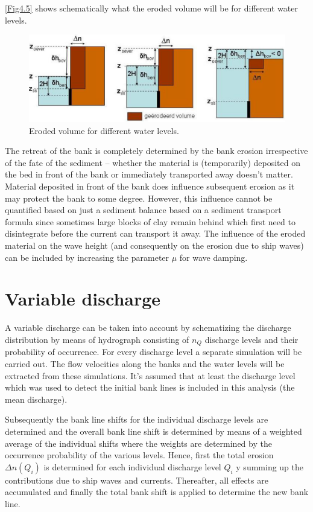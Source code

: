 \autoref{Fig4.5} shows schematically what the eroded volume will be for different water levels.

\begin{figure}
\includegraphics[width=\textwidth]{figures/Fig4-5.png}
\caption{Eroded volume for different water levels.}
\label{Fig4.5}
\end{figure}

The retreat of the bank is completely determined by the bank erosion irrespective of the fate of the sediment -- whether the material is (temporarily) deposited on the bed in front of the bank or immediately transported away doesn't matter.
Material deposited in front of the bank does influence subsequent erosion as it may protect the bank to some degree.
However, this influence cannot be quantified based on just a sediment balance based on a sediment transport formula since sometimes large blocks of clay remain behind which first need to disintegrate before the current can transport it away.
The influence of the eroded material on the wave height (and consequently on the erosion due to ship waves) can be included by increasing the parameter $\mu$ for wave damping.

\section{Variable discharge} \label{Sec4.5}

A variable discharge can be taken into account by schematizing the discharge distribution by means of hydrograph consisting of $n_Q$ discharge levels and their probability of occurrence.
For every discharge level a separate \dflowfm simulation will be carried out.
The flow velocities along the banks and the water levels will be extracted from these simulations.
It's assumed that at least the discharge level which was used to detect the initial bank lines is included in this analysis (the mean discharge).

Subsequently the bank line shifts for the individual discharge levels are determined and the overall bank line shift is determined by means of a weighted average of the individual shifts where the weights are determined by the occurrence probability of the various levels.
Hence, first the total erosion $\Delta n ( Q_i )$ is determined for each individual discharge level $Q_i$ y summing up the contributions due to ship waves and currents.
Thereafter, all effects are accumulated and finally the total bank shift is applied to determine the new bank line.

